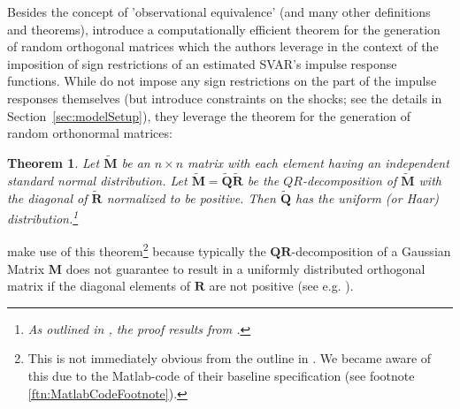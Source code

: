 \documentclass[a4paper,11pt,listof=nochaptergap,oneside,pointednumbers,bibtotoc,bigheadings,liststotoc,hidelinks]{scrbook}
\theoremstyle{mysatz}
\theoremstyle{mydefinition}
\theoremstyle{mytheorem}
\newtheorem{theo}[satz]{Theorem}
\theoremstyle{mybemerkung}
\newcommand{\vect}[1]{\boldsymbol{\mathbf{#1}}}
\begin{document}
Besides the concept of 'observational equivalence' (and many other definitions and theorems), \citet{rubioetal:10} introduce a computationally efficient theorem for the generation of random orthogonal matrices which the authors leverage in the context of the imposition of sign restrictions of an estimated SVAR's impulse response functions. While \citet{ludvigsonetal:19} do not impose any sign restrictions on the part of the impulse responses themselves (but introduce constraints on the shocks; see the details in Section~\ref{sec:modelSetup}), they leverage the theorem for the generation of random orthonormal matrices:

\begin{theo}
Let $\widetilde{\vect{M}}$ be an $n\times n$ matrix with each element having an independent standard normal distribution. Let $\widetilde{\vect{M}} = \widetilde{\vect{Q}}\widetilde{\vect{R}}$ be the $QR$-decomposition of $\widetilde{\vect{M}}$ with the diagonal of $\widetilde{\vect{R}}$ normalized to be positive. Then $\widetilde{\vect{Q}}$ has the uniform (or Haar) distribution.\footnote{As outlined in \citet{rubioetal:10}, the proof results from \citet{stewart:80}.}
\end{theo}

\citet{ludvigsonetal:19} make use of this theorem\footnote{This is not immediately obvious from the outline in \citet{ludvigsonetal:19}. We became aware of this due to the Matlab-code of their baseline specification (see footnote \ref{ftn:MatlabCodeFootnote}).} because typically the $\vect{QR}$-decomposition of a Gaussian Matrix $\vect{M}$ does not guarantee to result in a uniformly distributed orthogonal matrix if the diagonal elements of $\vect{R}$ are not positive (see e.g. \citealp{edelman:05}).
\end{document}
